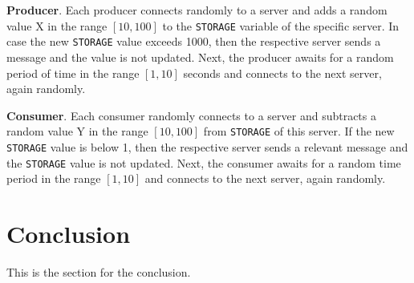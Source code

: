 \documentclass[acmlarge]{acmart}
\newcommand{\storage}{{\small \texttt{STORAGE}} }
\begin{document}
\textbf{Producer}. Each producer connects randomly to a server and adds a random value X in the range $[10, 100]$ to the \storage variable of the specific server. In case the new \storage value exceeds 1000, then the respective server sends a message and the value is not updated. Next, the producer awaits for a random period of time in the range $[1, 10]$ seconds and connects to the next server, again randomly.

\textbf{Consumer}. Each consumer randomly connects to a server and subtracts a random value Y in the range $[10, 100]$ from \storage of this server. If the new \storage value is below 1, then the respective server sends a relevant message and the \storage value is not updated. Next, the consumer awaits for a random time period in the range $[1, 10]$ and connects to the next server, again randomly.


\section{Conclusion}
\label{section:conclusion}
This is the section for the conclusion.
\end{document}
